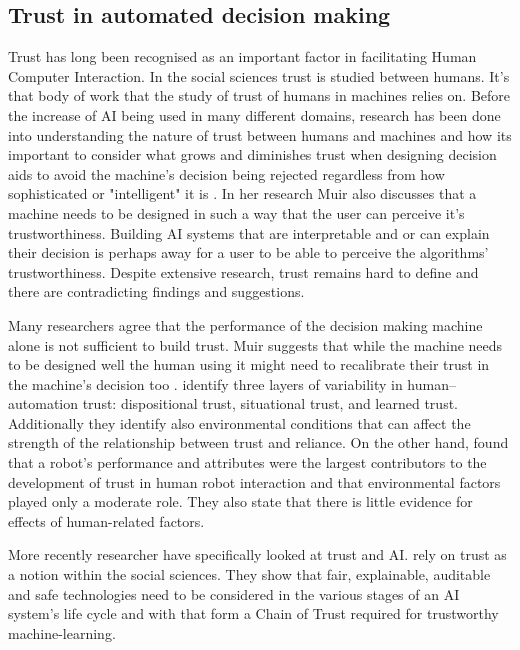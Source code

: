 \documentclass[manuscript,screen,review]{acmart}
\begin{document}
\subsection{Trust in automated decision making}\label{subsec:trust}

Trust has long been recognised as an important factor in facilitating Human Computer Interaction\cite{Lee2008}.
In the social sciences trust is studied between humans.
It's that body of work that the study of trust of humans in machines relies on.
Before the increase of AI being used in many different domains, research has been done into understanding the nature of trust between humans and machines and how its important to consider what grows and diminishes trust when designing decision aids to avoid the machine's decision being rejected regardless from how sophisticated or "intelligent" it is \cite{Muir1987}.
In her research Muir also discusses that a machine needs to be designed in such a way that the user can perceive it's trustworthiness\cite{Muir1987}.
Building AI systems that are interpretable and or can explain their decision is perhaps away for a user to be able to perceive the algorithms' trustworthiness.
Despite extensive research, trust remains hard to define and there are contradicting findings and suggestions.

Many researchers agree that the performance of the decision making machine alone is not sufficient to build trust.
Muir suggests that while the machine needs to be designed well the human using it might need to recalibrate their trust in the machine's decision too \cite{Muir1987}.
\cite{Hoff2015} identify three layers of variability in human–automation trust: dispositional trust, situational trust, and learned trust.
Additionally they identify also environmental conditions that can affect the strength of the relationship between trust and reliance.
On the other hand, \cite{Hancock2011} found that a robot's performance and attributes were the largest contributors to the development of trust in human robot interaction and that environmental factors played only a moderate role.
They also state that there is little evidence for effects of human-related factors.

More recently researcher have specifically looked at trust and AI. \cite{Toreini2020} rely on trust as a notion within the social sciences. They show that fair, explainable, auditable and safe technologies need to be considered in the various stages of an AI system's life cycle and with that form a Chain of Trust required for trustworthy machine-learning.
\end{document}

